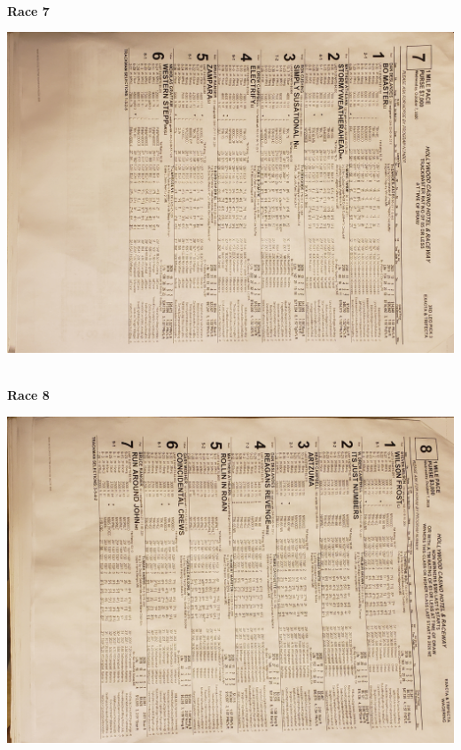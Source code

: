 \documentclass{article}
\begin{document}
\newpage
\begin{center}
\small{~\\}
\textbf{\LARGE{\textcolor[rgb]{0,0,0}{Race 7 }}}\\
\begin{turn}{90}
\includegraphics[scale=0.10]{race07.jpg}
\end{turn}
\end{center}

\newpage
\begin{center}
\small{~\\}
\textbf{\LARGE{\textcolor[rgb]{0,0,0}{Race 8 }}}\\
\begin{turn}{90}
\includegraphics[scale=0.10]{race08.jpg}
\end{turn}
\end{center}
\end{document}
